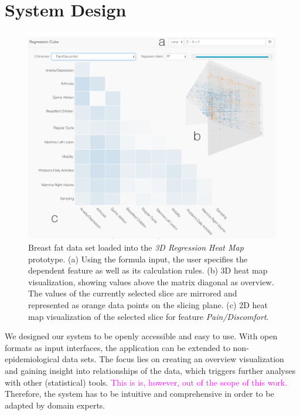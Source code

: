 \documentclass[journal]{style/vgtc} 			          %
\newcommand{\magenta}[1]{\textcolor{magenta}{#1}}
\begin{document}
\section{System Design} \label{sec:SystemDesign}
\begin{figure}[htb]
 \centering
 \includegraphics[width=1.0\linewidth]{figures/system}
 \caption{
 Breast fat data set loaded into the \emph{3D Regression Heat Map} prototype.
 (a) Using the formula input, the user specifies the dependent feature as well as its calculation rules.
 (b) 3D heat map visualization, showing values above the matrix diagonal as overview.
 The values of the currently selected slice are mirrored and represented as orange data points on the slicing plane.
 (c) 2D heat map visualization of the selected slice for feature \emph{Pain/Discomfort}.
 }
  \label{fig:System}
\end{figure}
\noindent We designed our system to be openly accessible and easy to use.
With open formats as input interfaces, the application can be extended to non-epidemiological data sets.
The focus lies on creating an overview visualization and gaining insight into relationships of the data, which triggers further analyses with other (statistical) tools.
\magenta{This is is, however, out of the scope of this work.}
Therefore, the system has to be intuitive and comprehensive in order to be adapted by domain experts.
\end{document}

